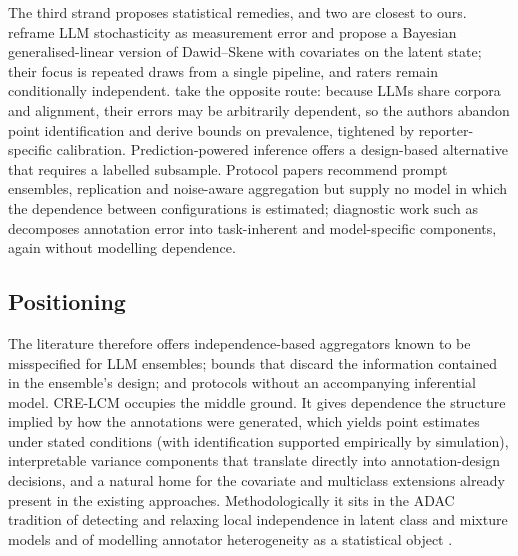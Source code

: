 The third strand proposes statistical remedies, and two are closest to ours. \citet{Zhang2025} reframe LLM stochasticity as measurement error and propose a Bayesian generalised-linear version of Dawid--Skene with covariates on the latent state; their focus is repeated draws from a single pipeline, and raters remain conditionally independent. \citet{Chen2026} take the opposite route: because LLMs share corpora and alignment, their errors may be arbitrarily dependent, so the authors abandon point identification and derive bounds on prevalence, tightened by reporter-specific calibration. Prediction-powered inference \citep{Angelopoulos2023} offers a design-based alternative that requires a labelled subsample. Protocol papers \citep{Camuffo2026} recommend prompt ensembles, replication and noise-aware aggregation but supply no model in which the dependence between configurations is estimated; diagnostic work such as \citet{Xu2026} decomposes annotation error into task-inherent and model-specific components, again without modelling dependence.

\subsection{Positioning}

The literature therefore offers independence-based aggregators known to be misspecified for LLM ensembles; bounds that discard the information contained in the ensemble's design; and protocols without an accompanying inferential model. CRE-LCM occupies the middle ground. It gives dependence the structure implied by how the annotations were generated, which yields point estimates under stated conditions (with identification supported empirically by simulation), interpretable variance components that translate directly into annotation-design decisions, and a natural home for the covariate and multiclass extensions already present in the existing approaches. Methodologically it sits in the ADAC tradition of detecting and relaxing local independence in latent class and mixture models \citep{Oberski2013,Marbac2016,Oberski2016} and of modelling annotator heterogeneity as a statistical object \citep{Salter-Townshend2014}.

